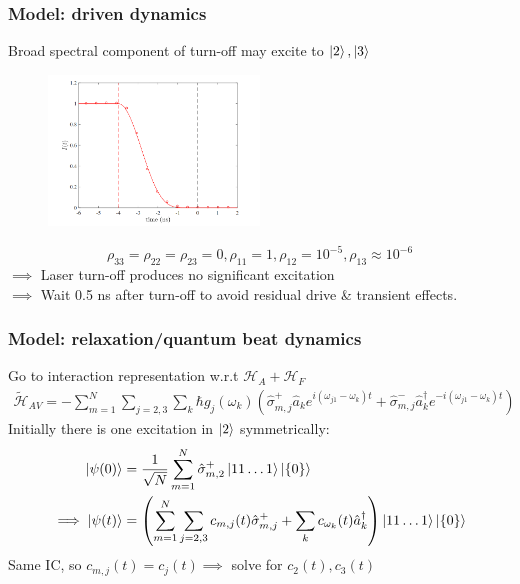 \documentclass{beamer}
\theoremstyle{definition}
\newcommand{\lp}{\left(}
\newcommand{\rp}{\right)}
\newcommand{\f}[2]{\frac{#1}{#2}}
\begin{document}
\begin{frame}
	\frametitle{Model: driven dynamics}
	Broad spectral component of turn-off may excite to $\ket{2},\ket{3}$
	\begin{figure}[!htb]
		\centering
		\includegraphics[width = 0.5\textwidth]{turn-off.png}
	\end{figure}
	$$\rho_{33}=\rho_{22} = \rho_{23} = 0, \rho_{11}=1, \rho_{12} = 10^{-5}, \rho_{13} \approx 10^{-6}$$
$\implies$ Laser turn-off produces no significant excitation \\
$\implies$ Wait 0.5 ns after turn-off to avoid residual drive \& transient effects.
\end{frame}




\begin{frame}
	\frametitle{Model: relaxation/quantum beat dynamics}
	Go to interaction representation w.r.t $\mathcal{H}_A + \mathcal{H}_F$ 
	\begin{align*}
	\widetilde{\mathcal{H}}_{AV} = -\sum^N_{m=1}\sum_{j=2,3} \sum_k \hbar g_j(\omega_k)\lp \hat \sigma_{m,j}^+ \hat a_k e^{i(\omega_{j1} - \omega_k) t} + \hat \sigma^-_{m,j} \hat a^\dagger_ke^{-i(\omega_{j1} - \omega_k) t}\rp
	\end{align*}
	Initially there is one excitation in $\ket{2}$ symmetrically:  
	\begin{align*}
	\ket{\psi(0)} &= \f{1}{\sqrt{N}} \sum^N_{m=1} \hat \sigma^+_{m,2} \ket{11\dots 1} \ket{\{0\}}\\
	\implies \ket{\psi(t)} &= \lp \sum^N_{m=1}\sum_{j=2,3} c_{m,j}(t)\hat \sigma_{m,j}^+ + \sum_k c_{\omega_k}(t)\hat a_k^\dagger \rp \ket{11\dots 1} \ket{\{0\}}
	\end{align*}
	Same IC, so $c_{m,j}(t) = c_{j}(t) \implies$ solve for $c_2(t), c_3(t)$ 
\end{frame}
\end{document}
